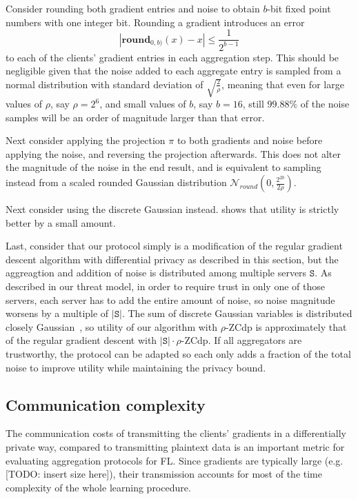 \documentclass{article}
\begin{document}
Consider rounding both gradient entries and noise to obtain $b$-bit fixed point numbers with one integer bit. Rounding a gradient introduces an error
$$|\textbf{round}_{0,b)}(x) - x|\leq\frac{1}{2^{b-1}}$$
to each of the clients' gradient entries in each aggregation step. This should be negligible given that the noise added to each aggregate entry is sampled from a normal distribution with standard deviation of $\sqrt{\frac{2}{\rho}}$, meaning that even for large values of $\rho$, say $\rho = 2^6$, and small values of $b$, say $b=16$, still $99.88\%$ of the noise samples will be an order of magnitude larger than that error.

Next consider applying the projection $\pi$ to both gradients and noise before applying the noise, and reversing the projection afterwards. This does not alter the magnitude of the noise in the end result, and is equivalent to sampling instead from a scaled rounded Gaussian distribution $\mathcal N_{round}\left(0,\frac{2^{2b}}{2\rho}\right)$.

Next consider using the discrete Gaussian instead. \cite[Corollary 17]{DBLP:journals/corr/abs-2004-00010} shows that utility is strictly better by a small amount.

Last, consider that our protocol simply is a modification of the regular gradient descent algorithm with differential privacy as described in this section, but the aggreagtion and addition of noise is distributed among multiple servers $\texttt{S}$. As described in our threat model, in order to require trust in only one of those servers, each server has to add the entire amount of noise, so noise magnitude worsens by a multiple of $|\texttt{S}|$. The sum of discrete Gaussian variables is distributed closely Gaussian~\cite[Theorem 11]{Kairouz2021TheDD}, so utility of our algorithm with $\rho$-ZCdp is approximately that of the regular gradient descent with $|\texttt{S}|\cdot\rho$-ZCdp. If all aggregators are trustworthy, the protocol can be adapted so each only adds a fraction of the total noise to improve utility while maintaining the privacy bound.


\subsection{Communication complexity}
The communication costs of transmitting the clients' gradients in a
differentially private way, compared to transmitting plaintext data is an
important metric for evaluating aggregation protocols for FL. Since gradients
are typically large (e.g. [TODO: insert size here]), their transmission accounts
for most of the time complexity of the whole learning procedure.
\end{document}
